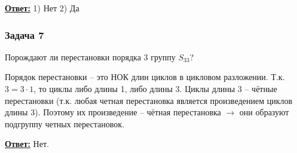 \documentclass[a4paper,14pt]{article} %
\begin{document}
\underline{\textbf{Ответ:}} 1) Нет 2) Да

\subsubsection{Задача 7}
Порождают ли перестановки порядка 3 группу $S_{33}$?

Порядок перестановки -- это НОК длин циклов в цикловом разложении. Т.к. $3 = 3 \cdot 1$, то циклы либо длины 1, либо длины 3. Циклы длины 3 -- чётные перестановки (т.к. любая четная перестановка является произведением циклов длины 3). Поэтому их произведение -- чётная перестановка $\rightarrow$ они образуют подгруппу четных перестановок.

\underline{\textbf{Ответ:}} Нет.
\end{document}
